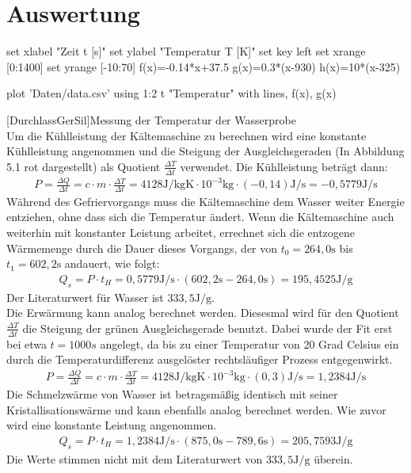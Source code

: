 \documentclass[12pt,a4paper]{scrartcl}
\begin{document}
	\section{Auswertung}
     \begin{gnuplot}[terminal=pdf,terminaloptions={font ",10" linewidth 1},scale=1.2]
		set xlabel "Zeit t [s]"
		set ylabel "Temperatur T [K]"
        set key left
   	 	set xrange [0:1400]
        set yrange [-10:70]
        f(x)=-0.14*x+37.5
    	g(x)=0.3*(x-930)
        h(x)=10*(x-325)
        
		plot 'Daten/data.csv' using 1:2 t "Temperatur" with lines, f(x), g(x)
	\end{gnuplot}
    [DurchlassGerSil]{Messung der Temperatur der Wasserprobe} \ \\
    Um die Kühlleistung der Kältemaschine zu berechnen wird eine konstante Kühlleistung angenommen und die Steigung der Ausgleichsgeraden (In Abbildung 5.1 rot dargestellt) als  Quotient $\frac{\Delta T}{\Delta t}$ verwendet. Die Kühlleistung beträgt dann:
    \begin{align*}
    	P = \frac{\Delta Q}{\Delta t} = c\cdot m\cdot \frac{\Delta T}{ \Delta t} = 4128 \si{\joule\per\kilogram\kelvin} \cdot  10^{-3} \si{\kilogram} \cdot (-0,14) \si{\joule\per\second} = -0,5779 \si{\joule\per\second}
    \end{align*}
    Während des Gefriervorgangs muss die Kältemaschine dem Wasser weiter Energie entziehen, ohne dass sich die Temperatur ändert. Wenn die Kältemaschine auch weiterhin mit konstanter Leistung arbeitet, errechnet sich die entzogene Wärmemenge durch die Dauer dieses Vorgangs, der von $t_0 = 264,0 \si{\second}$ bis $t_1 = 602,2 \si{\second}$ andauert, wie folgt:
    \begin{align*}
    	 Q_s = P \cdot t_H = 0,5779 \si{\joule\per\second} \cdot (602,2 \si{\second} - 264,0 \si{\second}) = 195,4525 \si{\joule\per\gram}
    \end{align*}
    Der Literaturwert für Wasser ist $333,5 \si{\joule\per\gram}$. \\
    Die Erwärmung kann analog berechnet werden. Diesesmal wird für den Quotient $\frac{\Delta T}{\Delta t}$ die Steigung der grünen Ausgleichsgerade benutzt. Dabei wurde der Fit erst bei etwa $t = 1000s$ angelegt, da bis zu einer Temperatur von 20 Grad Celsius ein durch die Temperaturdifferenz ausgelöster rechtsläufiger Prozess entgegenwirkt.
    \begin{align*}
    	P = \frac{\Delta Q}{\Delta t} = c\cdot m\cdot \frac{\Delta T}{\Delta t} = 4128 \si{\joule\per\kilogram\kelvin} \cdot  10^{-3} \si{\kilogram} \cdot (0,3) \si{\joule\per\second} = 1,2384 \si{\joule\per\second}
    \end{align*}
    Die Schmelzwärme von Wasser ist betragsmäßig identisch mit seiner Kristallisationswärme und kann ebenfalls analog berechnet werden. Wie zuvor wird eine konstante Leistung angenommen.
    \begin{align*}
    	Q_s = P \cdot t_H = 1,2384 \si{\joule\per\second} \cdot (875,0 \si{\second} - 789,6 \si{\second}) = 205,7593 \si{\joule\per\gram}
    \end{align*}
    Die Werte stimmen nicht mit dem Literaturwert von $333,5 \si{\joule\per\gram}$ überein.
    
\end{document}
